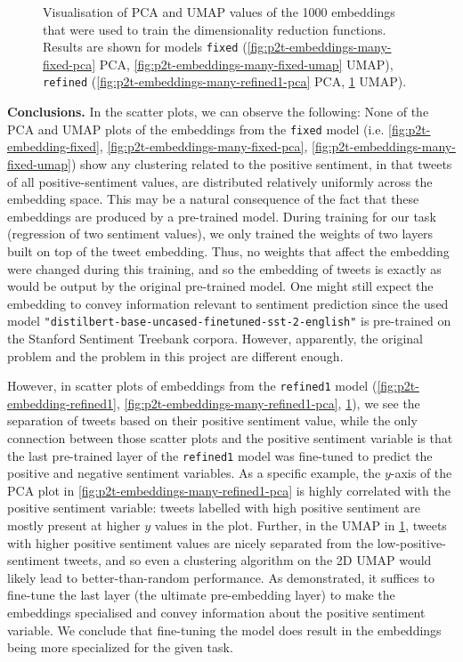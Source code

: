 \begin{figure}
\begin{subfigure}{0.49\textwidth}
        \caption{}\label{fig:p2t-embeddings-many-refined1-umap}
    \end{subfigure}
    \caption{Visualisation of PCA and UMAP values of the 1000 embeddings that were used to train the dimensionality reduction functions. Results are shown for models \texttt{fixed} (\cref{fig:p2t-embeddings-many-fixed-pca} PCA, \cref{fig:p2t-embeddings-many-fixed-umap} UMAP), \texttt{refined} (\cref{fig:p2t-embeddings-many-refined1-pca} PCA, \cref{fig:p2t-embeddings-many-refined1-umap} UMAP).}
    \label{fig:p2t-embeddings-many}
\end{figure}

\textbf{Conclusions.}
In the scatter plots, we can observe the following: None of the PCA and UMAP plots of the embeddings from the \texttt{fixed} model (i.e. \cref{fig:p2t-embedding-fixed}, \cref{fig:p2t-embeddings-many-fixed-pca}, \cref{fig:p2t-embeddings-many-fixed-umap}) show any clustering related to the positive sentiment, in that tweets of all positive-sentiment values, are distributed relatively uniformly across the embedding space.
This may be a natural consequence of the fact that these embeddings are produced by a pre-trained model.
During training for our task (regression of two sentiment values), we only trained the weights of two layers built on top of the tweet embedding. Thus, no weights that affect the embedding were changed during this training, and so the embedding of tweets is exactly as would be output by the original pre-trained model.
One might still expect the embedding to convey information relevant to sentiment prediction since the used model \texttt{"distilbert-base-uncased-finetuned-sst-2-english"} is pre-trained on the Stanford Sentiment Treebank \cite{socherRecursiveDeepModels2013} corpora. However, apparently, the original problem and the problem in this project are different enough.

However, in scatter plots of embeddings from the \texttt{refined1} model (\cref{fig:p2t-embedding-refined1}, \cref{fig:p2t-embeddings-many-refined1-pca}, \cref{fig:p2t-embeddings-many-refined1-umap}), we see the separation of tweets based on their positive sentiment value, while the only connection between those scatter plots and the positive sentiment variable is that the last pre-trained layer of the \texttt{refined1} model was fine-tuned to predict the positive and negative sentiment variables.
As a specific example, the $y$-axis of the PCA plot in \cref{fig:p2t-embeddings-many-refined1-pca} is highly correlated with the positive sentiment variable: tweets labelled with high positive sentiment are mostly present at higher $y$ values in the plot.
Further, in the UMAP in \cref{fig:p2t-embeddings-many-refined1-umap}, tweets with higher positive sentiment values are nicely separated from the low-positive-sentiment tweets, and so even a clustering algorithm on the 2D UMAP would likely lead to better-than-random performance.
As demonstrated, it suffices to fine-tune the last layer (the ultimate pre-embedding layer) to make the embeddings specialised and convey information about the positive sentiment variable.
We conclude that fine-tuning the model does result in the embeddings being more specialized for the given task.

